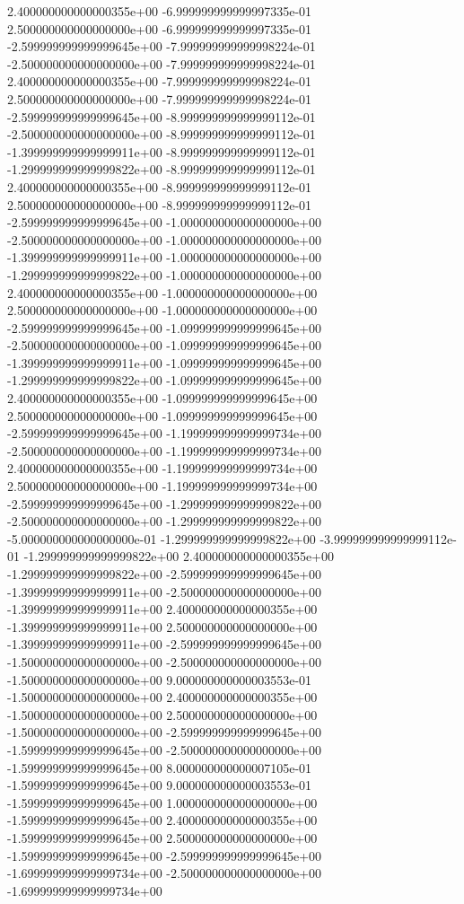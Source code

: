 2.400000000000000355e+00 -6.999999999999997335e-01
2.500000000000000000e+00 -6.999999999999997335e-01
-2.599999999999999645e+00 -7.999999999999998224e-01
-2.500000000000000000e+00 -7.999999999999998224e-01
2.400000000000000355e+00 -7.999999999999998224e-01
2.500000000000000000e+00 -7.999999999999998224e-01
-2.599999999999999645e+00 -8.999999999999999112e-01
-2.500000000000000000e+00 -8.999999999999999112e-01
-1.399999999999999911e+00 -8.999999999999999112e-01
-1.299999999999999822e+00 -8.999999999999999112e-01
2.400000000000000355e+00 -8.999999999999999112e-01
2.500000000000000000e+00 -8.999999999999999112e-01
-2.599999999999999645e+00 -1.000000000000000000e+00
-2.500000000000000000e+00 -1.000000000000000000e+00
-1.399999999999999911e+00 -1.000000000000000000e+00
-1.299999999999999822e+00 -1.000000000000000000e+00
2.400000000000000355e+00 -1.000000000000000000e+00
2.500000000000000000e+00 -1.000000000000000000e+00
-2.599999999999999645e+00 -1.099999999999999645e+00
-2.500000000000000000e+00 -1.099999999999999645e+00
-1.399999999999999911e+00 -1.099999999999999645e+00
-1.299999999999999822e+00 -1.099999999999999645e+00
2.400000000000000355e+00 -1.099999999999999645e+00
2.500000000000000000e+00 -1.099999999999999645e+00
-2.599999999999999645e+00 -1.199999999999999734e+00
-2.500000000000000000e+00 -1.199999999999999734e+00
2.400000000000000355e+00 -1.199999999999999734e+00
2.500000000000000000e+00 -1.199999999999999734e+00
-2.599999999999999645e+00 -1.299999999999999822e+00
-2.500000000000000000e+00 -1.299999999999999822e+00
-5.000000000000000000e-01 -1.299999999999999822e+00
-3.999999999999999112e-01 -1.299999999999999822e+00
2.400000000000000355e+00 -1.299999999999999822e+00
-2.599999999999999645e+00 -1.399999999999999911e+00
-2.500000000000000000e+00 -1.399999999999999911e+00
2.400000000000000355e+00 -1.399999999999999911e+00
2.500000000000000000e+00 -1.399999999999999911e+00
-2.599999999999999645e+00 -1.500000000000000000e+00
-2.500000000000000000e+00 -1.500000000000000000e+00
9.000000000000003553e-01 -1.500000000000000000e+00
2.400000000000000355e+00 -1.500000000000000000e+00
2.500000000000000000e+00 -1.500000000000000000e+00
-2.599999999999999645e+00 -1.599999999999999645e+00
-2.500000000000000000e+00 -1.599999999999999645e+00
8.000000000000007105e-01 -1.599999999999999645e+00
9.000000000000003553e-01 -1.599999999999999645e+00
1.000000000000000000e+00 -1.599999999999999645e+00
2.400000000000000355e+00 -1.599999999999999645e+00
2.500000000000000000e+00 -1.599999999999999645e+00
-2.599999999999999645e+00 -1.699999999999999734e+00
-2.500000000000000000e+00 -1.699999999999999734e+00
